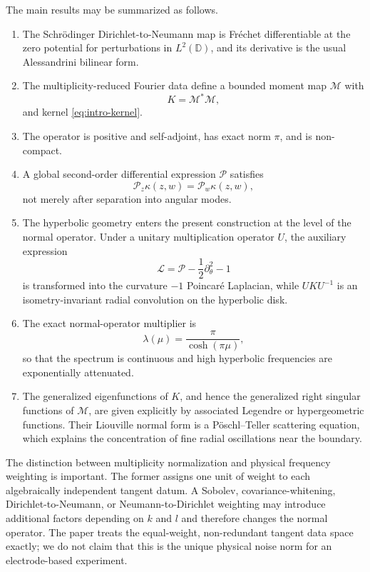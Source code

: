 \IfFileExists{iopjournal.cls}{\documentclass{iopjournal}}{\documentclass{iopjournal-draft}}
\theoremstyle{definition}
\theoremstyle{remark}
\newcommand{\D}{\mathbb D}
\numberwithin{equation}{section}
\begin{document}
The main results may be summarized as follows.
\begin{enumerate}[label=(\roman*)]
\item The Schr\"odinger Dirichlet-to-Neumann map is Fr\'echet differentiable at the zero potential for perturbations in $L^2(\D)$, and its derivative is the usual Alessandrini bilinear form.
\item The multiplicity-reduced Fourier data define a bounded moment map $\mathcal{M}$ with 
\[
 K=\mathcal{M}^*\mathcal{M},
 \]
and kernel \eqref{eq:intro-kernel}.
\item The operator is positive and self-adjoint, has exact norm $\pi$, and is non-compact.
\item A global second-order differential expression $\mathcal P$ satisfies
\[
 \mathcal P_z\kappa(z,w)=\mathcal P_w\kappa(z,w),
\]
not merely after separation into angular modes.
\item The hyperbolic geometry enters the present construction at the
level of the normal operator.  Under a unitary multiplication operator
$U$, the auxiliary expression
\[
\mathcal L=\mathcal P-\frac12\partial_\theta^2-1
\]
is transformed into the curvature $-1$ Poincar\'e Laplacian, while
$UKU^{-1}$ is an isometry-invariant radial convolution on the
hyperbolic disk.
\item The exact normal-operator multiplier is
\[
\lambda(\mu)=\frac{\pi}{\cosh(\pi\mu)},
\]
so that the spectrum is continuous and high hyperbolic frequencies
are exponentially attenuated.




\item The generalized eigenfunctions of $K$, and hence the generalized
right singular functions of $\mathcal M$, are given explicitly by
associated Legendre or hypergeometric functions.  Their Liouville
normal form is a P\"oschl--Teller scattering equation, which explains
the concentration of fine radial oscillations near the boundary.

\end{enumerate}


The distinction between multiplicity normalization and physical frequency weighting is important.  The former assigns one unit of weight to each algebraically independent tangent datum.  A Sobolev, covariance-whitening, Dirichlet-to-Neumann, or Neumann-to-Dirichlet weighting may introduce additional factors depending on $k$ and $l$ and therefore changes the normal operator.  The paper treats the equal-weight, non-redundant tangent data space exactly; we do not claim that this is the unique physical noise norm for an electrode-based experiment.
\end{document}
